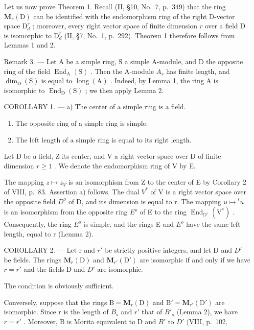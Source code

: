 Let us now prove Theorem 1. Recall (II, §10, No.~7, p.~349) that the ring \(\mathbf{M}_r(\mathrm{D})\) can be identified with the endomorphism ring of the right D-vector space \(\mathrm{D}_d^r\) ; moreover, every right vector space of finite dimension \(r\) over a field D is isomorphic to \(\mathrm{D}_d^r\) (II, §7, No.~1, p.~292). Theorem 1 therefore follows from Lemmas 1 and 2.

Remark 3. --- Let A be a simple ring, S a simple A-module, and D the opposite ring of the field \(\operatorname{End}_{\mathrm{A}}(\mathrm{S})\) . Then the A-module \(A_{s}\) has finite length, and \(\dim_{\mathrm{D}}(\mathrm{S})\) is equal to \(\operatorname{long}(\mathrm{A})\) . Indeed, by Lemma 1, the ring A is isomorphic to \(\operatorname{End}_{\mathrm{D}}(\mathrm{S})\) ; we then apply Lemma 2.

COROLLARY 1. --- a) The center of a simple ring is a field.

\begin{enumerate}
\def\labelenumi{\alph{enumi})}
\setcounter{enumi}{1}
\item
  The opposite ring of a simple ring is simple.
\item
  The left length of a simple ring is equal to its right length.
\end{enumerate}

Let D be a field, Z its center, and V a right vector space over D of finite dimension \(r \geqslant 1\) . We denote the endomorphism ring of V by E.

The mapping \(z \mapsto z_{V}\) is an isomorphism from Z to the center of E by Corollary 2 of VIII, p.~83. Assertion a) follows. The dual \(V^{*}\) of V is a right vector space over the opposite field \(D^{o}\) of D, and its dimension is equal to r. The mapping \(u \mapsto {}^{t}u\) is an isomorphism from the opposite ring \(E^{o}\) of E to the ring \(\operatorname{End}_{\mathrm{D}^{\circ}}(\mathrm{V}^{*})\) . Consequently, the ring \(E^{o}\) is simple, and the rings E and \(E^{o}\) have the same left length, equal to r (Lemma 2).

COROLLARY 2. --- Let r and \(r'\) be strictly positive integers, and let D and \(D'\) be fields. The rings \(\mathbf{M}_{r}(\mathrm{D})\) and \(\mathbf{M}_{r'}(\mathrm{D}')\) are isomorphic if and only if we have \(r = r'\) and the fields D and \(D'\) are isomorphic.

The condition is obviously sufficient.

Conversely, suppose that the rings \(\mathrm{B} = \mathbf{M}_{r}(\mathrm{D})\) and \(\mathrm{B}' = \mathbf{M}_{r'}(\mathrm{D}')\) are isomorphic. Since r is the length of \(B_{s}\) and \(r'\) that of \(B'_{s}\) (Lemma 2), we have \(r = r'\) . Moreover, B is Morita equivalent to D and \(B'\) to \(D'\) (VIII, p.~102,

